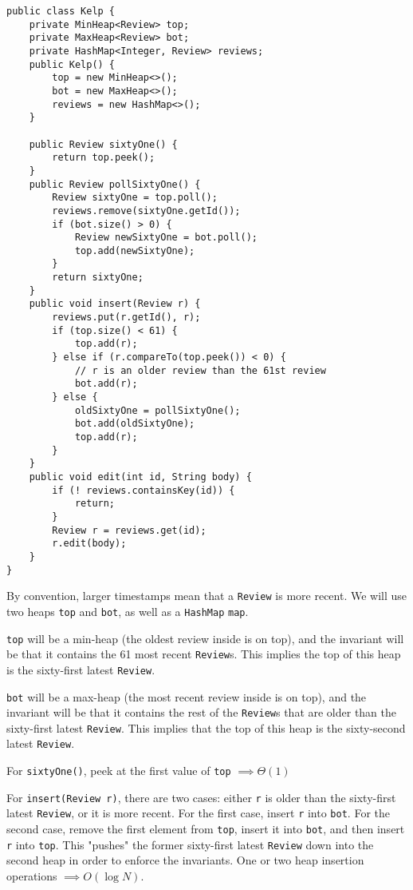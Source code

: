 \begin{solution}
\begin{lstlisting}
public class Kelp {
    private MinHeap<Review> top;
    private MaxHeap<Review> bot;
    private HashMap<Integer, Review> reviews;
    public Kelp() {
        top = new MinHeap<>();
        bot = new MaxHeap<>();
        reviews = new HashMap<>();
    }

    public Review sixtyOne() {
        return top.peek();
    }
    public Review pollSixtyOne() {
        Review sixtyOne = top.poll();
        reviews.remove(sixtyOne.getId());
        if (bot.size() > 0) {
            Review newSixtyOne = bot.poll();
            top.add(newSixtyOne);
        }
        return sixtyOne;
    }
    public void insert(Review r) {
        reviews.put(r.getId(), r);
        if (top.size() < 61) {
            top.add(r);
        } else if (r.compareTo(top.peek()) < 0) {
            // r is an older review than the 61st review
            bot.add(r);
        } else {
            oldSixtyOne = pollSixtyOne();
            bot.add(oldSixtyOne);
            top.add(r);
        }
    }
    public void edit(int id, String body) {
        if (! reviews.containsKey(id)) {
            return;
        }
        Review r = reviews.get(id);
        r.edit(body);
    }
}
\end{lstlisting}

By convention, larger timestamps mean that a \lstinline$Review$ is more recent. We will use two heaps \lstinline$top$ and \lstinline$bot$, as well as a \lstinline$HashMap$ \lstinline$map$.

\lstinline$top$ will be a min-heap (the oldest review inside is on top), and the invariant will be that it contains the 61 most recent \lstinline$Review$s. This implies the top of this heap is the sixty-first latest \lstinline$Review$.

\lstinline$bot$ will be a max-heap (the most recent review inside is on top), and the invariant will be that it contains the rest of the \lstinline$Review$s that are older than the sixty-first latest \lstinline$Review$. This implies that the top of this heap is the sixty-second latest \lstinline$Review$.

For \lstinline$sixtyOne()$, peek at the first value of \lstinline$top$ $\implies \Theta(1)$

For \lstinline$insert(Review r)$, there are two cases: either \lstinline$r$ is older than the sixty-first latest \lstinline$Review$, or it is more recent. For the first case, insert \lstinline$r$ into \lstinline$bot$. For the second case, remove the first element from \lstinline$top$, insert it into \lstinline$bot$, and then insert \lstinline$r$ into \lstinline$top$. This "pushes" the former sixty-first latest \lstinline$Review$ down into the second heap in order to enforce the invariants. One or two heap insertion operations $\implies O(\log N)$.


\end{solution}
